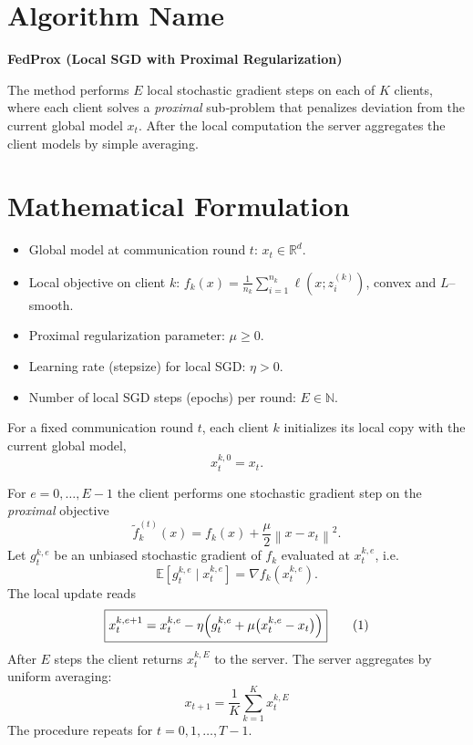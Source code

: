 \documentclass{article}
\newcommand{\E}{\mathbb{E}}
\newcommand{\norm}[1]{\left\lVert #1\right\rVert}
\begin{document}
\section*{Algorithm Name}
\textbf{FedProx (Local SGD with Proximal Regularization)}  

The method performs $E$ local stochastic gradient steps on each of $K$ clients, where each client solves a \emph{proximal} sub‑problem that penalizes deviation from the current global model $x_t$. After the local computation the server aggregates the client models by simple averaging.

\section*{Mathematical Formulation}
\begin{itemize}
    \item Global model at communication round $t$: $x_t\in\mathbb{R}^d$.
    \item Local objective on client $k$: $f_k(x)=\frac{1}{n_k}\sum_{i=1}^{n_k} \ell(x;z_i^{(k)})$, convex and $L$–smooth.
    \item Proximal regularization parameter: $\mu\ge 0$.
    \item Learning rate (stepsize) for local SGD: $\eta>0$.
    \item Number of local SGD steps (epochs) per round: $E\in\mathbb{N}$.
\end{itemize}

For a fixed communication round $t$, each client $k$ initializes its local copy with the current global model,
\[
x_{t}^{k,0}=x_t .
\]

For $e=0,\dots,E-1$ the client performs one stochastic gradient step on the \emph{proximal} objective
\[
\tilde f_k^{(t)}(x)=f_k(x)+\frac{\mu}{2}\norm{x-x_t}^2 .
\]
Let $g_{t}^{k,e}$ be an unbiased stochastic gradient of $f_k$ evaluated at $x_{t}^{k,e}$, i.e.
\[
\E\!\left[g_{t}^{k,e}\mid x_{t}^{k,e}\right]=\nabla f_k(x_{t}^{k,e}).
\]
The local update reads
\begin{equation}
\boxed{
x_{t}^{k,e+1}=x_{t}^{k,e}-\eta\Bigl(g_{t}^{k,e}+\mu\bigl(x_{t}^{k,e}-x_t\bigr)\Bigr)
}
\tag{1}
\end{equation}
After $E$ steps the client returns $x_{t}^{k,E}$ to the server.  
The server aggregates by uniform averaging:
\begin{equation}
\boxed{
x_{t+1}= \frac{1}{K}\sum_{k=1}^{K} x_{t}^{k,E}
}
\tag{2}
\end{equation}
The procedure repeats for $t=0,1,\dots,T-1$.
\end{document}

